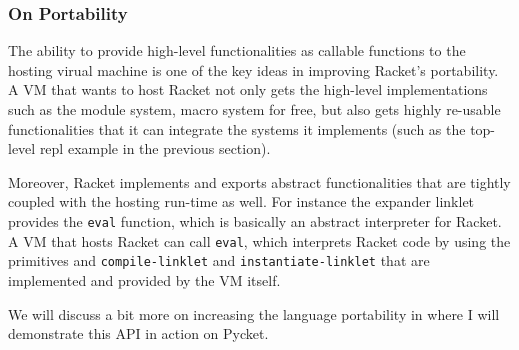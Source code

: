 \subsubsection{On Portability}
\label{subsec:portability}

The ability to provide high-level functionalities as callable
functions to the hosting virual machine is one of the key ideas in
improving Racket's portability. A VM that wants to host Racket not
only gets the high-level implementations such as the module system,
macro system for free, but also gets highly re-usable functionalities
that it can integrate the systems it implements (such as the top-level
repl example in the previous section).

Moreover, Racket implements and exports abstract functionalities that
are tightly coupled with the hosting run-time as well. For instance
the expander linklet provides the \verb|eval| function, which is
basically an abstract interpreter for Racket. A VM that hosts Racket
can call \verb|eval|, which interprets Racket code by using the
primitives and \verb|compile-linklet| and \verb|instantiate-linklet|
that are implemented and provided by the VM itself.

We will discuss a bit more on increasing the language portability in
 where I will demonstrate this API in action on
Pycket.
